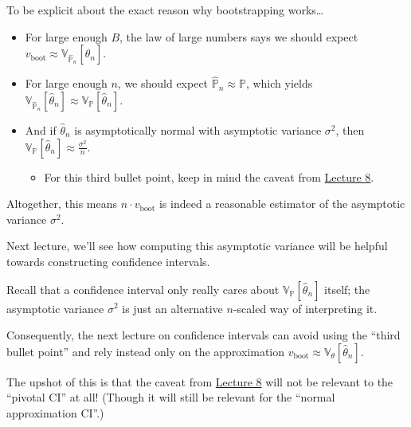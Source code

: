 \begin{remark}
    To be explicit about the exact reason why bootstrapping works\dots
    \begin{itemize}
        \item For large enough $B$, the law of large numbers says
        we should expect $v_{\mathrm{boot}} \approx
        \mathbb{V}_{\hat{\mathbb{P}}_n}[\hat{\theta}_n]$.
        \item For large enough $n$,
        we should expect $\hat{\mathbb{P}}_n \approx \mathbb{P}$,
        which yields $\mathbb{V}_{\hat{\mathbb{P}}_n}[\hat{\theta}_n]
        \approx \mathbb{V}_{\mathbb{P}}[\hat{\theta}_n]$.
        \item And if $\hat{\theta}_n$ is asymptotically normal with
        asymptotic variance $\sigma^2$, then
        $\mathbb{V}_{\mathbb{P}}[\hat{\theta}_n] \approx \frac{\sigma^2}{n}$.
        \begin{itemize}
            \item For this third bullet point,
            keep in mind the caveat from
            \href{/18.650/lectures/8/#asymptotic-normality}{Lecture 8}.
        \end{itemize}
    \end{itemize}
    Altogether, this means $n \cdot v_{\mathrm{boot}}$ is indeed
    a reasonable estimator of the asymptotic variance $\sigma^2$.
\end{remark}

Next lecture, we'll see how
computing this asymptotic variance will be helpful
towards constructing confidence intervals.

\begin{remark}
    Recall that a confidence interval only really cares about
    $\mathbb{V}_{\mathbb{P}}[\hat{\theta}_n]$ itself;
    the asymptotic variance $\sigma^2$ is just
    an alternative $n$-scaled way of interpreting it.

    Consequently, the next lecture on confidence intervals
    can avoid using the ``third bullet point'' and rely instead
    only on the approximation
    $v_{\mathrm{boot}} \approx \mathbb{V}_{\theta}[\hat{\theta}_n]$.

    The upshot of this is that the caveat from
    \href{/18.650/lectures/8/#asymptotic-normality}{Lecture 8}
    will not be relevant to the ``pivotal CI'' at all!
    (Though it will still be relevant
    for the ``normal approximation CI''.)
\end{remark}

